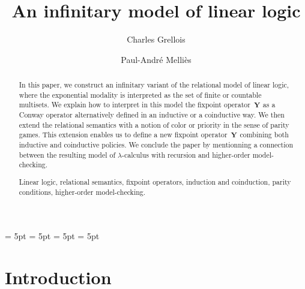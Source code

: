 \documentclass[runningheads,a4paper]{llncs}
\newcommand{\keywords}[1]{\par\addvspace\baselineskip
\noindent\keywordname\enspace\ignorespaces#1}
\newcommand{\fixpoint}[1]{\textbf{Y}_{#1}}
\begin{document}
\mainmatter  

\title{An infinitary model of linear logic}

\author{Charles Grellois \and Paul-Andr\'e Melli\`es}


\maketitle

\begin{abstract}
In this paper, we construct an infinitary variant of the relational model of linear logic, 
where the exponential modality is interpreted as the set of finite or countable multisets. 
We explain how to interpret in this model the fixpoint operator~$\fixpoint{}$ as a Conway operator 
alternatively defined in an inductive or a coinductive way. We then extend the relational semantics
with a notion of color or priority in the sense of parity games. This extension enables us 
to define a new fixpoint operator~$\fixpoint{}$ combining both inductive and coinductive policies. 
We conclude the paper by mentionning a connection between the resulting model of
$\lambda$-calculus with recursion and higher-order model-checking.
\keywords{Linear logic, relational semantics, fixpoint operators, induction and coinduction,
parity conditions, higher-order model-checking.}
\end{abstract}

\abovedisplayskip = 5pt
\belowdisplayskip = 5pt
\abovedisplayshortskip = 5pt
\belowdisplayshortskip = 5pt
\section{Introduction}
\end{document}
